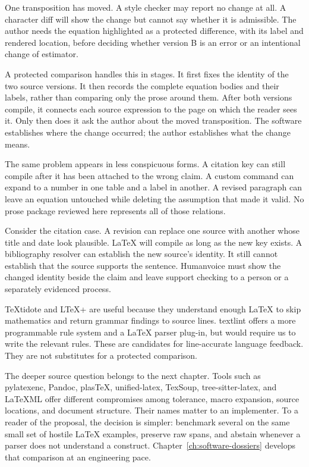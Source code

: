 One transposition has moved. A style checker may report no change at all. A
character diff will show the change but cannot say whether it is admissible.
The author needs the equation highlighted as a protected difference, with its
label and rendered location, before deciding whether version B is an error or
an intentional change of estimator.

A protected comparison handles this in stages. It first fixes the identity of
the two source versions. It then records the complete equation bodies and their
labels, rather than comparing only the prose around them. After both versions
compile, it connects each source expression to the page on which the reader
sees it. Only then does it ask the author about the moved transposition. The
software establishes where the change occurred; the author establishes what
the change means.

The same problem appears in less conspicuous forms. A citation key can still
compile after it has been attached to the wrong claim. A custom command can
expand to a number in one table and a label in another. A revised paragraph can
leave an equation untouched while deleting the assumption that made it valid.
No prose package reviewed here represents all of those relations.

\Needspace{11cm}
Consider the citation case. A revision can replace one source with another
whose title and date look plausible. LaTeX will compile as long as the new key
exists. A bibliography resolver can establish the new source's identity. It
still cannot establish that the source supports the sentence. Humanvoice must
show the changed identity beside the claim and leave support checking to a
person or a separately evidenced process.

TeXtidote and LTeX+ are useful because they understand enough LaTeX to skip
mathematics and return grammar findings to source lines. textlint offers a more
programmable rule system and a LaTeX parser plug-in, but would require us to
write the relevant rules. These are candidates for line-accurate language
feedback. They are not substitutes for a protected comparison.

The deeper source question belongs to the next chapter. Tools such as
pylatexenc, Pandoc, plasTeX, unified-latex, TexSoup, tree-sitter-latex, and
LaTeXML offer different compromises among tolerance, macro expansion, source
locations, and document structure. Their names matter to an implementer. To a
reader of the proposal, the decision is simpler: benchmark several on the same
small set of hostile LaTeX examples, preserve raw spans, and abstain whenever a
parser does not understand a construct. Chapter~\ref{ch:software-dossiers}
develops that comparison at an engineering pace.


